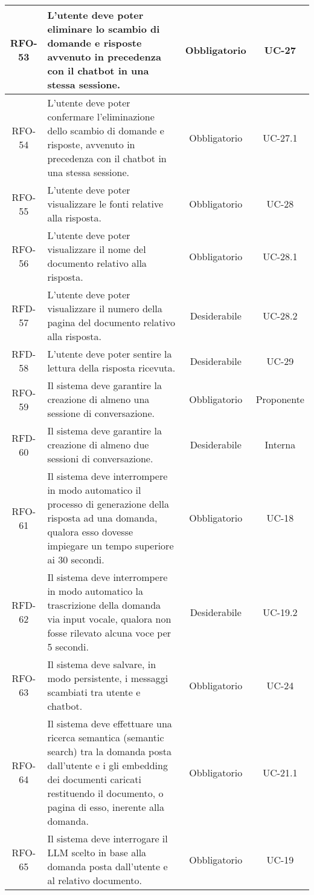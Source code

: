 \begin{xltabular}{\textwidth}{| c | X | c | c |}
    \hline
    RFO-53 & L’utente deve poter eliminare lo scambio di domande e risposte avvenuto in precedenza con il chatbot in una stessa sessione. & Obbligatorio & UC-27 \\
    \hline
    RFO-54 & L’utente deve poter confermare l'eliminazione dello scambio di domande e risposte, avvenuto in precedenza con il chatbot in una stessa sessione. & Obbligatorio & UC-27.1 \\
    \hline
    RFO-55 & L’utente deve poter visualizzare le fonti relative alla risposta. & Obbligatorio & UC-28 \\
    \hline
    RFO-56 & L’utente deve poter visualizzare il nome del documento relativo alla risposta. & Obbligatorio & UC-28.1 \\
    \hline
    RFD-57 & L'utente deve poter visualizzare il numero della pagina del documento relativo alla risposta. & Desiderabile & UC-28.2 \\
    \hline
    RFD-58 & L’utente deve poter sentire la lettura della risposta ricevuta. & Desiderabile & UC-29 \\
    \hline
    RFO-59 & Il sistema deve garantire la creazione di almeno una sessione di conversazione. & Obbligatorio & Proponente\\ %
    \hline
    RFD-60 & Il sistema deve garantire la creazione di almeno due sessioni di conversazione. & Desiderabile & Interna\\ %
    \hline
    RFO-61 & Il sistema deve interrompere in modo automatico il processo di generazione della risposta ad una domanda, qualora esso dovesse impiegare un tempo superiore ai 30 secondi. & Obbligatorio & UC-18\\
    \hline
    RFD-62 & Il sistema deve interrompere in modo automatico la trascrizione della domanda via input vocale, qualora non fosse rilevato alcuna voce per 5 secondi. & Desiderabile & UC-19.2\\
    \hline
    RFO-63 & Il sistema deve salvare, in modo persistente, i messaggi scambiati tra utente e chatbot. & Obbligatorio & UC-24\\
    \hline
    RFO-64 & Il sistema deve effettuare una ricerca semantica (semantic search) tra la domanda posta dall'utente e i gli embedding dei documenti caricati restituendo il documento, o pagina di esso, inerente alla domanda. & Obbligatorio & UC-21.1\\
    \hline
    RFO-65 & Il sistema deve interrogare il LLM scelto in base alla domanda posta dall'utente e al relativo documento. & Obbligatorio & UC-19\\

\end{xltabular}
